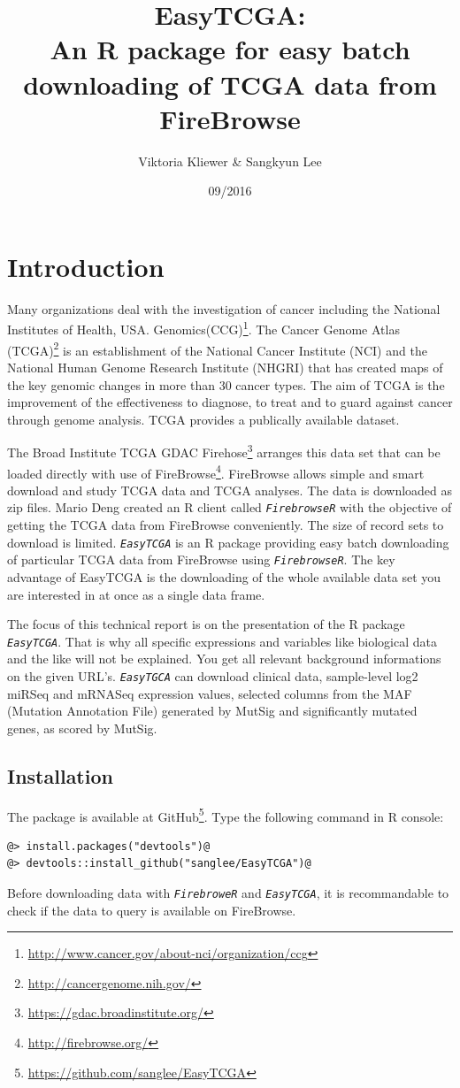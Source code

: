 \documentclass{TechReport}
\title{EasyTCGA:\\ An R package for easy batch downloading of TCGA data from FireBrowse}
\author{Viktoria Kliewer \& Sangkyun Lee}
\date{09/2016}        %
\begin{document}
\makesfbtitlepage

\section{Introduction}
Many organizations deal with the investigation of cancer including the National
Institutes of Health, USA.
Genomics(CCG)\footnote{\url{http://www.cancer.gov/about-nci/organization/ccg}}.
The Cancer Genome Atlas
(TCGA)\footnote{\url{http://cancergenome.nih.gov/}} is an
establishment of the National Cancer Institute (NCI) and the National
Human Genome Research Institute (NHGRI) that has created maps of the
key genomic changes in more than 30 cancer types. The aim of TCGA is
the improvement of the effectiveness to diagnose, to treat and to guard
against cancer through genome analysis. TCGA provides a publically
available dataset.

The Broad Institute TCGA GDAC
Firehose\footnote{\url{https://gdac.broadinstitute.org/}} arranges
this data set that can be loaded directly with use of
FireBrowse\footnote{\url{http://firebrowse.org/}}. FireBrowse allows
simple and smart download and study TCGA data and TCGA analyses. The
data is
downloaded as zip files.
Mario Deng created an R client called \texttt{\em FirebrowseR} with
the objective of getting the TCGA data from FireBrowse conveniently.
The size of record sets to download is limited. \texttt{\em EasyTCGA}
is an R package providing easy batch downloading of particular TCGA
data from FireBrowse using \texttt{\em FirebrowseR}. The key advantage
of EasyTCGA is the downloading of the whole available
data set you are interested in at once as a single data frame.

The focus of this technical report is on the presentation of the R
package \texttt{\em EasyTCGA}. That is why all specific expressions and
variables like biological data and the like will not be explained. You
get all relevant
background informations on the given URL's.
\texttt{\em EasyTGCA} can download clinical data, sample-level log2
miRSeq and mRNASeq expression values, selected columns from the MAF
(Mutation Annotation File) generated by MutSig and significantly
mutated genes, as scored by MutSig.

\subsection{Installation}
The package is available at
GitHub\footnote{\url{https://github.com/sanglee/EasyTCGA}}. Type the following
command in R console:
\begin{lstlisting}[style=base]
@> install.packages("devtools")@
@> devtools::install_github("sanglee/EasyTCGA")@
\end{lstlisting}
Before downloading data with \texttt{\em FirebroweR} and \texttt{\em EasyTCGA}, it is
recommandable to check if the data to query is available 
on FireBrowse\footnotemark[4].\\
\end{document}
